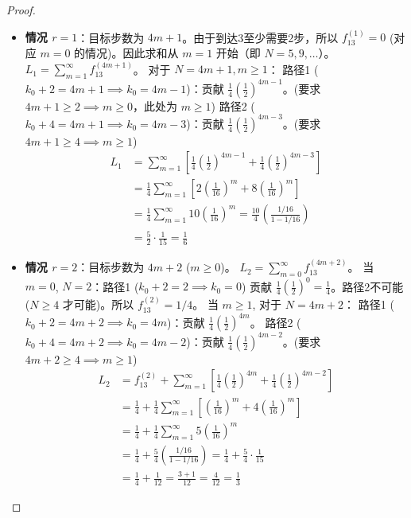 \documentclass[lang=cn,10pt,thmcnt=section]{elegantbook}
\begin{document}
\begin{proof}
\begin{itemize}
    \item \textbf{情况 $r=1$}：目标步数为 $4m+1$。由于到达3至少需要2步，所以 $f_{13}^{(1)}=0$ (对应 $m=0$ 的情况)。因此求和从 $m=1$ 开始（即 $N=5, 9, \dots$）。
    $L_1 = \sum_{m=1}^{\infty} f_{13}^{(4m+1)}$。
    对于 $N=4m+1, m \ge 1$：
    路径1 ($k_0+2 = 4m+1 \implies k_0=4m-1$)：贡献 $\frac{1}{4}\left(\frac{1}{2}\right)^{4m-1}$。(要求 $4m+1 \ge 2 \implies m \ge 0$，此处为 $m \ge 1$)
    路径2 ($k_0+4 = 4m+1 \implies k_0=4m-3$)：贡献 $\frac{1}{4}\left(\frac{1}{2}\right)^{4m-3}$。(要求 $4m+1 \ge 4 \implies m \ge 1$)
    \begin{align*} L_1 &= \sum_{m=1}^{\infty} \left[ \frac{1}{4}\left(\frac{1}{2}\right)^{4m-1} + \frac{1}{4}\left(\frac{1}{2}\right)^{4m-3} \right] \\ &= \frac{1}{4} \sum_{m=1}^{\infty} \left[ 2\left(\frac{1}{16}\right)^m + 8\left(\frac{1}{16}\right)^m \right] \\ &= \frac{1}{4} \sum_{m=1}^{\infty} 10\left(\frac{1}{16}\right)^m = \frac{10}{4} \left( \frac{1/16}{1 - 1/16} \right) \\ &= \frac{5}{2} \cdot \frac{1}{15} = \frac{1}{6} \end{align*}

    \item \textbf{情况 $r=2$}：目标步数为 $4m+2$ ($m \ge 0$)。
    $L_2 = \sum_{m=0}^{\infty} f_{13}^{(4m+2)}$。
    当 $m=0$, $N=2$：路径1 ($k_0+2=2 \implies k_0=0$) 贡献 $\frac{1}{4}\left(\frac{1}{2}\right)^0 = \frac{1}{4}$。路径2不可能 ($N \ge 4$ 才可能)。所以 $f_{13}^{(2)} = 1/4$。
    当 $m \ge 1$, 对于 $N=4m+2$：
    路径1 ($k_0+2 = 4m+2 \implies k_0=4m$)：贡献 $\frac{1}{4}\left(\frac{1}{2}\right)^{4m}$。
    路径2 ($k_0+4 = 4m+2 \implies k_0=4m-2$)：贡献 $\frac{1}{4}\left(\frac{1}{2}\right)^{4m-2}$。(要求 $4m+2 \ge 4 \implies m \ge 1$)
    \begin{align*} L_2 &= f_{13}^{(2)} + \sum_{m=1}^{\infty} \left[ \frac{1}{4}\left(\frac{1}{2}\right)^{4m} + \frac{1}{4}\left(\frac{1}{2}\right)^{4m-2} \right] \\ &= \frac{1}{4} + \frac{1}{4} \sum_{m=1}^{\infty} \left[ \left(\frac{1}{16}\right)^m + 4\left(\frac{1}{16}\right)^m \right] \\ &= \frac{1}{4} + \frac{1}{4} \sum_{m=1}^{\infty} 5\left(\frac{1}{16}\right)^m \\ &= \frac{1}{4} + \frac{5}{4} \left( \frac{1/16}{1 - 1/16} \right) = \frac{1}{4} + \frac{5}{4} \cdot \frac{1}{15} \\ &= \frac{1}{4} + \frac{1}{12} = \frac{3+1}{12} = \frac{4}{12} = \frac{1}{3} \end{align*}


\end{itemize}
\end{proof}
\end{document}
